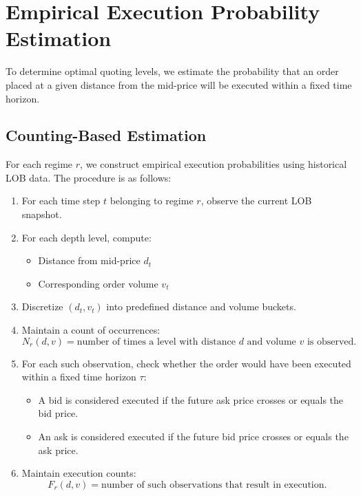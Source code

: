 \documentclass[12pt,a4paper]{report}
\begin{document}
\section{Empirical Execution Probability Estimation}

To determine optimal quoting levels, we estimate the probability that an order placed at a given distance from the mid-price will be executed within a fixed time horizon.

\subsection{Counting-Based Estimation}

For each regime $r$, we construct empirical execution probabilities using historical LOB data. The procedure is as follows:

\begin{enumerate}
    \item For each time step $t$ belonging to regime $r$, observe the current LOB snapshot.
    
    \item For each depth level, compute:
    \begin{itemize}
        \item Distance from mid-price $d_t$
        \item Corresponding order volume $v_t$
    \end{itemize}
    
    \item Discretize $(d_t, v_t)$ into predefined distance and volume buckets.
    
    \item Maintain a count of occurrences:
    \[
    N_r(d,v) = \text{number of times a level with distance } d \text{ and volume } v \text{ is observed}.
    \]
    
    \item For each such observation, check whether the order would have been executed within a fixed time horizon $\tau$:
    \begin{itemize}
        \item A bid is considered executed if the future ask price crosses or equals the bid price.
        \item An ask is considered executed if the future bid price crosses or equals the ask price.
    \end{itemize}
    
    \item Maintain execution counts:
    \[
    F_r(d,v) = \text{number of such observations that result in execution}.
    \]
\end{enumerate}
\end{document}
